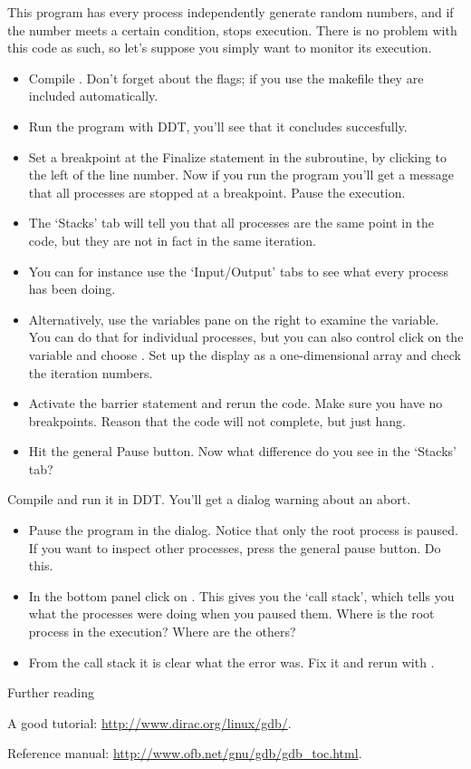 \begin{pcse}
 This program has every process independently generate
random numbers, and if the number meets a certain condition, stops execution.
There is no problem with this code as such, so let's suppose you simply want
to monitor its execution.
\begin{itemize}
\item Compile . Don't forget about the  flags;
  if you use the makefile they are included automatically.
\item Run the program with DDT, you'll see that it concludes
  succesfully.
\item Set a breakpoint at the Finalize statement in the subroutine, by
  clicking to the left of the line number. Now if you run the program
  you'll get a message that all processes are stopped at a
  breakpoint. Pause the execution.
\item The `Stacks' tab will tell you that all processes are the same
  point in the code, but they are not in fact in the same
  iteration. 
\item You can for instance use the `Input/Output' tabs to see what every process has been doing.
\item Alternatively, use the variables pane on the right to examine
  the  variable. You can do that for individual processes, but
  you can also control click on the  variable and choose . Set up the display as a one-dimensional array and check
  the iteration numbers.
\item Activate the barrier statement and rerun the code. Make sure you
  have no breakpoints. Reason that the code will not complete, but
  just hang.
\item Hit the general Pause button. Now what difference do you see in the `Stacks' tab?
\end{itemize}

 Compile  and run it in DDT. You'll
get a dialog warning about an abort.
\begin{itemize}
\item Pause the program in the dialog. Notice that only the root process is
  paused. If you want to inspect other processes, press the general
  pause button. Do this.
\item In the bottom panel click on . This gives you the
  `call stack', which tells you what the processes were doing when you
  paused them. Where is the root process in the execution? Where are
  the others?
\item From the call stack it is clear what the error was. Fix it and
  rerun with .
\end{itemize}


\end{pcse}


 {Further reading}

A good tutorial: \url{http://www.dirac.org/linux/gdb/}.

Reference manual: \url{http://www.ofb.net/gnu/gdb/gdb_toc.html}.


